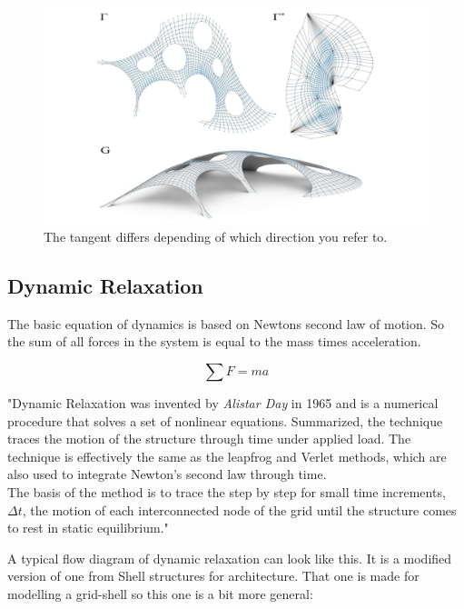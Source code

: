 \begin{figure}[H]
\centering
\includegraphics[width=0.6\linewidth ]{figure/Theory/RhinoVault.jpg}
\caption{The tangent differs depending of which direction you refer to. }
\end{figure}

\subsection{Dynamic Relaxation}

The basic equation of dynamics is based on Newtons second law of motion. So the sum of all forces in the system is equal to the mass times acceleration.

\begin{equation}
\sum F = ma
\end{equation}

"Dynamic Relaxation was invented by \textit{ Alistar Day} in 1965 and is a numerical procedure that solves a set of nonlinear equations. Summarized, the technique traces the motion of the structure through time under applied load. The technique is effectively the same as the leapfrog and Verlet methods, which are also used to integrate Newton's second law through time.\\
The basis of the method is to trace the step by step for small time increments, $\Delta t$, the motion of each interconnected node of the grid until the structure comes to rest in static equilibrium."

A typical flow diagram of dynamic relaxation can look like this. It is a modified version of one from Shell structures for architecture. That one is made for modelling a grid-shell so this one is a bit more general:

